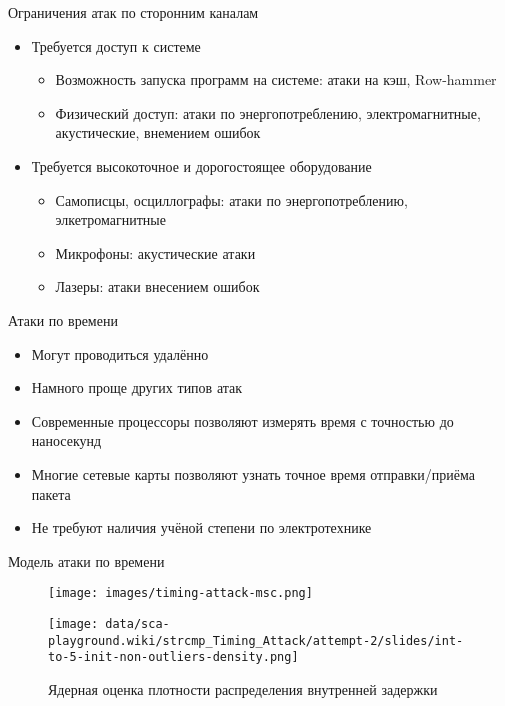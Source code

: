 \documentclass[14pt]{beamer}
\begin{document}
\begin{frame}{Ограничения атак по сторонним каналам}
    \begin{itemize}
        \item Требуется доступ к системе
            \begin{itemize}
                \item Возможность запуска программ на системе: атаки на кэш, Row-hammer
                \item Физический доступ: атаки по энергопотреблению, электромагнитные, акустические, внемением ошибок
            \end{itemize}
        \item Требуется высокоточное и дорогостоящее оборудование
            \begin{itemize}
                \item Самописцы, осциллографы: атаки по энергопотреблению, элкетромагнитные
                \item Микрофоны: акустические атаки
                \item Лазеры: атаки внесением ошибок
            \end{itemize}
    \end{itemize}
\end{frame}

\begin{frame}{Атаки по времени}
    \begin{itemize}
        \item Могут проводиться удалённо
        \item Намного проще других типов атак
        \item Современные процессоры позволяют измерять время с точностью до наносекунд
        \item Многие сетевые карты позволяют узнать точное время отправки/приёма пакета
        \item Не требуют наличия учёной степени по электротехнике
    \end{itemize}
\end{frame}

\begin{frame}{Модель атаки по времени}
    \begin{figure}
        \centering
        \texttt{[image: images/timing-attack-msc.png]}
    \end{figure}
\end{frame}

\begin{frame}[nologo]
    \begin{figure}
        \centering
        \texttt{[image: data/sca-playground.wiki/strcmp\_Timing\_Attack/attempt-2/slides/int-to-5-init-non-outliers-density.png]}
        \caption{Ядерная оценка плотности распределения внутренней задержки}
    \end{figure}
\end{frame}
\end{document}

